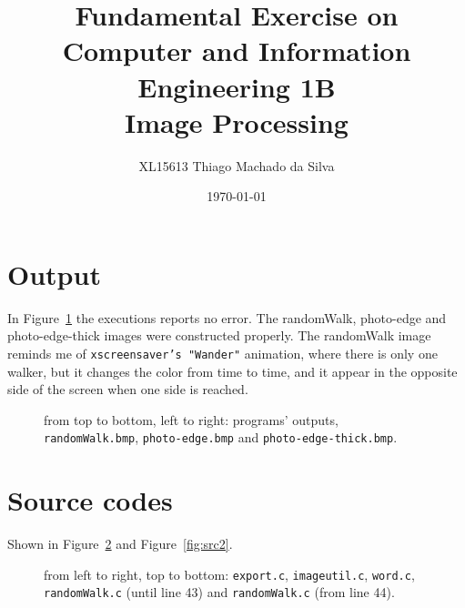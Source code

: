 \documentclass{article}
\title{Fundamental Exercise on Computer and Information Engineering 1B \\ Image Processing}
\author{XL15613   Thiago Machado da Silva}
\date{\today}
\begin{document}
\maketitle

\section*{Output}
In Figure~\ref{fig:output} the executions reports no error. The randomWalk, photo-edge and photo-edge-thick images were constructed properly. The randomWalk image reminds me of {\tt xscreensaver's "Wander"} animation, where there is only one walker, but it changes the color from time to time, and it appear in the opposite side of the screen when one side is reached. \\
\begin{figure}[htbp]
  \centering
  \caption{from top to bottom, left to right: programs' outputs, {\tt randomWalk.bmp}, {\tt photo-edge.bmp} and {\tt photo-edge-thick.bmp}.}
  \label{fig:output}
\end{figure}

\section*{Source codes}
Shown in Figure~\ref{fig:src1} and Figure~\ref{fig:src2}.

\begin{figure}[h]
  \centering
  \caption{from left to right, top to bottom: {\tt export.c}, {\tt imageutil.c}, {\tt word.c}, {\tt randomWalk.c} (until line 43) and {\tt randomWalk.c} (from line 44).}
  \label{fig:src1}
\end{figure}
\end{document}
